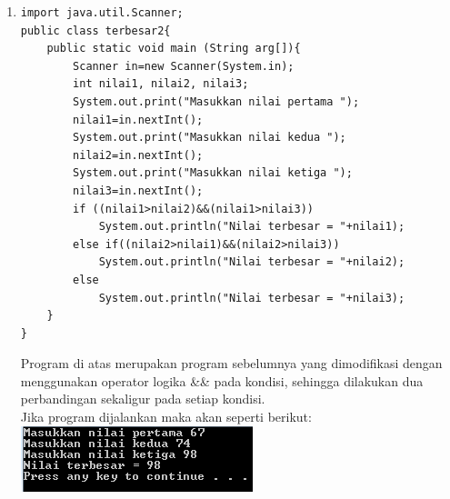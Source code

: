 \documentclass[a4paper,12pt]{article}
\begin{document}
\begin{enumerate}[label=\textbf{\arabic* .}]
        \item 
            \begin{lstlisting}[frame=single]
import java.util.Scanner;
public class terbesar2{
    public static void main (String arg[]){
        Scanner in=new Scanner(System.in);
        int nilai1, nilai2, nilai3;
        System.out.print("Masukkan nilai pertama ");
        nilai1=in.nextInt();
        System.out.print("Masukkan nilai kedua ");
        nilai2=in.nextInt();
        System.out.print("Masukkan nilai ketiga ");
        nilai3=in.nextInt();
        if ((nilai1>nilai2)&&(nilai1>nilai3))
            System.out.println("Nilai terbesar = "+nilai1);
        else if((nilai2>nilai1)&&(nilai2>nilai3))
            System.out.println("Nilai terbesar = "+nilai2);
        else
            System.out.println("Nilai terbesar = "+nilai3);
    }
}               
            \end{lstlisting}
            Program di atas merupakan program sebelumnya yang dimodifikasi dengan menggunakan operator logika \&& pada kondisi, sehingga dilakukan dua
            perbandingan sekaligur pada setiap kondisi.\\
            Jika program dijalankan maka akan seperti berikut:\\
            \includegraphics{05b.PNG}

            \newpage


\end{enumerate}
\end{document}
